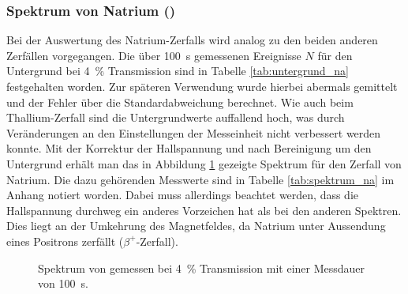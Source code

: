 \documentclass[11pt, a4paper]{article}
\numberwithin{equation}{section}
\begin{document}
\subsubsection{Spektrum von Natrium ()}
\begin{table}
	\vspace{-12pt}
	\centering
	
	\caption{Untergrundmessung für  mit Messdauer \SI{100}{\second} bei \SI{4}{\percent} Transmission.}
	\label{tab:untergrund_na}
\end{table}
Bei der Auswertung des Natrium-Zerfalls wird analog zu den beiden anderen Zerfällen vorgegangen.
Die über \SI{100}{\second} gemessenen Ereignisse $N$ für den Untergrund bei \SI{4}{\percent} Transmission sind in Tabelle \ref{tab:untergrund_na} festgehalten worden.
Zur späteren Verwendung wurde hierbei abermals gemittelt und der Fehler über die Standardabweichung berechnet.
Wie auch beim Thallium-Zerfall sind die Untergrundwerte auffallend hoch, was durch Veränderungen an den Einstellungen der Messeinheit nicht verbessert werden konnte.
Mit der Korrektur der Hallspannung und nach Bereinigung um den Untergrund erhält man das in Abbildung \ref{fig:natrium_spectrum} gezeigte Spektrum für den Zerfall von Natrium.
Die dazu gehörenden Messwerte sind in Tabelle \ref{tab:spektrum_na} im Anhang notiert worden.
Dabei muss allerdings beachtet werden, dass die Hallspannung durchweg ein anderes Vorzeichen hat als bei den anderen Spektren.
Dies liegt an der Umkehrung des Magnetfeldes, da Natrium unter Aussendung eines Positrons zerfällt ($\beta^+$-Zerfall).
\begin{figure}[h]
	\centering
	
	\caption{Spektrum von  gemessen bei \SI{4}{\percent} Transmission mit einer Messdauer von \SI{100}{\second}.}
	\label{fig:natrium_spectrum}
\end{figure}
\FloatBarrier
\end{document}
